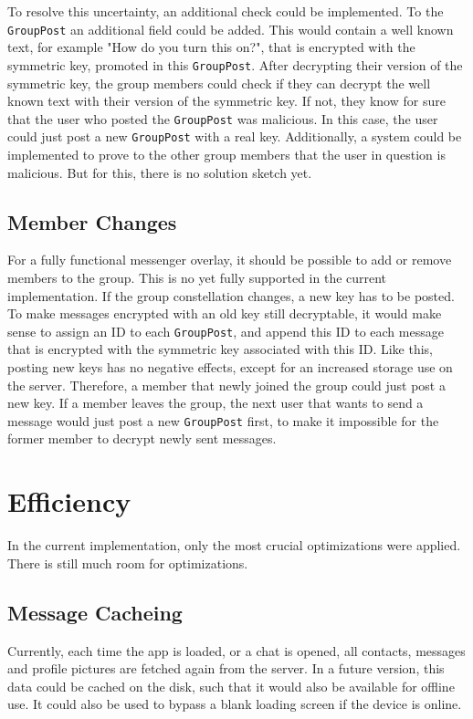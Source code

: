 \documentclass[a4paper, oneside]{discothesis}
\begin{document}
To resolve this uncertainty, an additional check could be implemented. To the \texttt{GroupPost} an additional field could be added. This would contain a well known text, for example "How do you turn this on?", that is encrypted with the symmetric key, promoted in this \texttt{GroupPost}. After decrypting their version of the symmetric key, the group members could check if they can decrypt the well known text with their version of the symmetric key. If not, they know for sure that the user who posted the \texttt{GroupPost} was malicious. In this case, the user could just post a new \texttt{GroupPost} with a real key. Additionally, a system could be implemented to prove to the other group members that the user in question is malicious. But for this, there is no solution sketch yet.

\subsection{Member Changes}
\label{sec:group_member_changes}
For a fully functional messenger overlay, it should be possible to add or remove members to the group. This is no yet fully supported in the current implementation. If the group constellation changes, a new key has to be posted. To make messages encrypted with an old key still decryptable, it would make sense to assign an ID to each \texttt{GroupPost}, and append this ID to each message that is encrypted with the symmetric key associated with this ID. Like this, posting new keys has no negative effects, except for an increased storage use on the server. Therefore, a member that newly joined the group could just post a new key. If a member leaves the group, the next user that wants to send a message would just post a new \texttt{GroupPost} first, to make it impossible for the former member to decrypt newly sent messages.

\section{Efficiency}

In the current implementation, only the most crucial optimizations were applied. There is still much room for optimizations.

\subsection{Message Cacheing}

Currently, each time the app is loaded, or a chat is opened, all contacts, messages and profile pictures are fetched again from the server. In a future version, this data could be cached on the disk, such that it would also be available for offline use. It could also be used to bypass a blank loading screen if the device is online.
\end{document}

